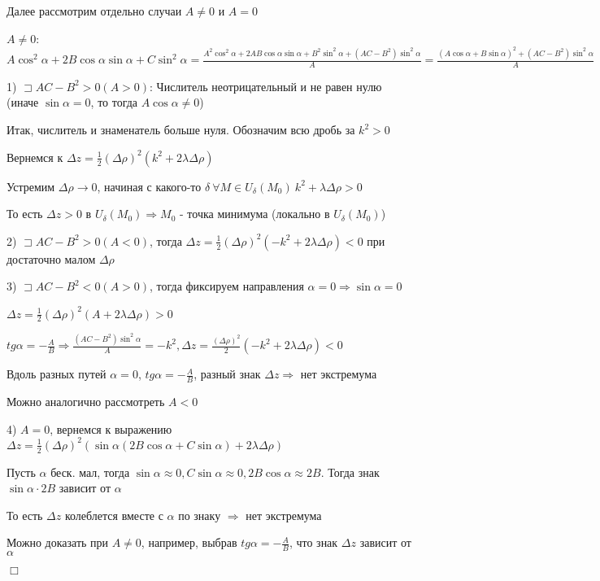 \documentclass[12pt]{article}
\begin{document}
    Далее рассмотрим отдельно случаи $A \neq 0$ и $A = 0$

    $A \neq 0$: $A\cos^2\alpha + 2B\cos\alpha\sin\alpha + C\sin^2\alpha = \frac{A^2\cos^2\alpha + 2AB\cos\alpha\sin\alpha + B^2\sin^2\alpha + (AC - B^2)\sin^2\alpha}{A} =
    \frac{(A\cos\alpha + B\sin\alpha)^2 + (AC - B^2)\sin^2\alpha}{A}$

    1) $\sqsupset AC - B^2 > 0 (A > 0)$: Числитель неотрицательный и не равен нулю (иначе $\sin\alpha = 0$, то тогда $A\cos\alpha \neq 0$)

    Итак, числитель и знаменатель больше нуля. Обозначим всю дробь за $k^2 > 0$

    Вернемся к $\Delta z = \frac{1}{2}(\Delta \rho)^2 (k^2 + 2\lambda\Delta\rho)$

    Устремим $\Delta \rho \rightarrow 0$, начиная с какого-то $\delta \ \forall M \in U_\delta(M_0) \ k^2 + \lambda\Delta\rho > 0$

    То есть $\Delta z > 0$ в $U_\delta(M_0) \Longrightarrow M_0$ - точка минимума (локально в $U_\delta(M_0)$)

    2) $\sqsupset AC - B^2 > 0 (A < 0)$, тогда $\Delta z = \frac{1}{2}(\Delta \rho)^2 (-k^2 + 2\lambda\Delta\rho) < 0$ при достаточно малом $\Delta \rho$

    3) $\sqsupset AC - B^2 < 0 (A > 0)$, тогда фиксируем направления $\alpha = 0 \Longrightarrow \sin\alpha = 0$

    $\Delta z = \frac{1}{2}(\Delta \rho)^2 (A + 2\lambda\Delta\rho) > 0$

    $tg \alpha = -\frac{A}{B} \Longrightarrow \frac{(AC - B^2)\sin^2\alpha}{A} = -k^2, \Delta z = \frac{(\Delta \rho)^2}{2}(-k^2 + 2\lambda\Delta\rho) < 0$

    Вдоль разных путей $\alpha = 0$, $tg \alpha = -\frac{A}{B}$, разный знак $\Delta z \Longrightarrow$ нет экстремума

    \Nota Можно аналогично рассмотреть $A < 0$

    4) $A = 0$, вернемся к выражению $\Delta z = \frac{1}{2} (\Delta \rho)^2 (\sin\alpha(2B\cos\alpha + C\sin\alpha) + 2\lambda\Delta\rho)$

    Пусть $\alpha$ беск. мал, тогда $\sin\alpha \approx 0, C\sin\alpha \approx 0, 2B\cos\alpha \approx 2B$. Тогда знак $\sin\alpha \cdot 2B$ зависит от $\alpha$

    То есть $\Delta z$ колеблется вместе с $\alpha$ по знаку $\Longrightarrow$ нет экстремума

    Можно доказать при $A \neq 0$, например, выбрав $tg \alpha = -\frac{A}{B}$, что знак $\Delta z$ зависит от $\alpha$

    $\Box$
\end{document}
